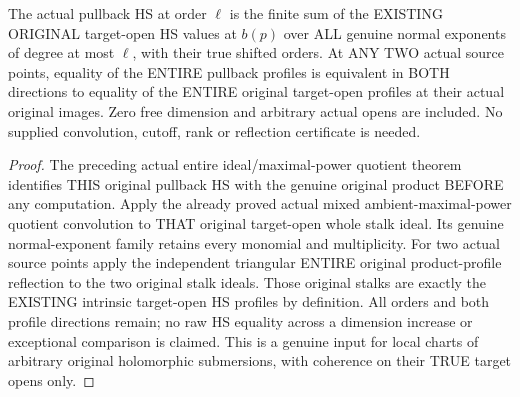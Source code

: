 \begin{theorem}
\label{hir:actual-target-open-block-projection-hs-convolution-reflection}
\leanok
The actual pullback HS at order $\ell$ is the finite sum of the EXISTING
ORIGINAL target-open HS values at $b(p)$ over ALL genuine normal exponents
of degree at most $\ell$, with their true shifted orders. At ANY TWO
actual source points, equality of the ENTIRE pullback profiles is equivalent
in BOTH directions to equality of the ENTIRE original target-open profiles
at their actual original images. Zero free dimension and arbitrary actual
opens are included. No supplied convolution, cutoff, rank or reflection
certificate is needed.
\end{theorem}
\begin{proof}
The preceding actual entire ideal/maximal-power quotient theorem identifies
THIS original pullback HS with the genuine original product BEFORE any
computation. Apply the already proved actual mixed ambient-maximal-power
quotient convolution to THAT original target-open whole stalk ideal. Its
genuine normal-exponent family retains every monomial and multiplicity.
For two actual source points apply the independent triangular ENTIRE
original product-profile reflection to the two original stalk ideals.
Those original stalks are exactly the EXISTING intrinsic target-open HS
profiles by definition. All orders and both profile directions remain;
no raw HS equality across a dimension increase or exceptional comparison
is claimed. This is a genuine input for local charts of arbitrary original
holomorphic submersions, with coherence on their TRUE target opens only.
\end{proof}
